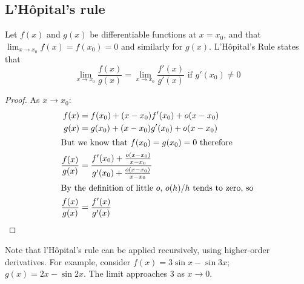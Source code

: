 \subsection{L'H\^opital's rule}
Let \(f(x)\) and \(g(x)\) be differentiable functions at \(x=x_0\), and that \(\lim_{x\to x_0} f(x) = f(x_0) = 0\) and similarly for \(g(x)\).
L'H\^opital's Rule states that
\[
	\lim_{x\to x_0} \frac{f(x)}{g(x)} = \lim_{x\to x_0} \frac{f'(x)}{g'(x)} \text{ if } g'(x_0) \neq 0
\]
\begin{proof}
	As \(x \to x_0\):
	\begin{align*}
		f(x)              & = f(x_0) + (x-x_0) f'(x_0) + o(x-x_0)                                       \\
		g(x)              & = g(x_0) + (x-x_0) g'(x_0) + o(x-x_0)                                       \\
		\intertext{But we know that \(f(x_0)=g(x_0)=0\) therefore}
		\frac{f(x)}{g(x)} & = \frac{f'(x_0) + \frac{o(x-x_0)}{x-x_0}}{g'(x_0) + \frac{o(x-x_0)}{x-x_0}} \\
		\intertext{By the definition of little \(o\), \(o(h)/h\) tends to zero, so}
		\frac{f(x)}{g(x)} & = \frac{f'(x)}{g'(x)}
	\end{align*}
\end{proof}
Note that l'H\^opital's rule can be applied recursively, using higher-order derivatives.
For example, consider \(f(x) = 3\sin x - \sin 3x\); \(g(x) = 2x - \sin 2x\).
The limit approaches 3 as \(x \to 0\).

